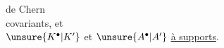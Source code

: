 \begin{flushright}
 de Chern\\
covariants, et\\
$\unsure{K^\bullet|K'}$ et $\unsure{A^\bullet|A'}$ \uline{à supports}.
\end{flushright}
